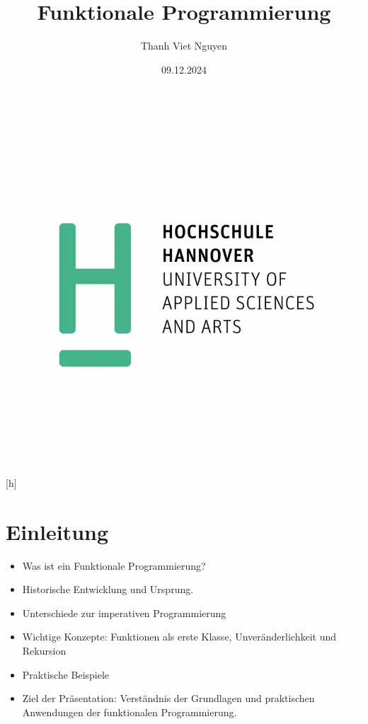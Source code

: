 \documentclass{beamer}
\title{Funktionale Programmierung}
\author{Thanh Viet Nguyen}
\begin{document}
\begin{frame}%
    \maketitle
    \centering
 \includegraphics[scale=0.15]{bilder/hsh-logo.jpg}[h]
   \date{09.12.2024}

\end{frame}

\begin{frame}
	\tableofcontents
\end{frame}


\section{Einleitung}
\begin{frame}
\begin{itemize}
\item Was ist ein Funktionale Programmierung? 	
\item Historische Entwicklung und Ursprung.
\item Unterschiede zur imperativen Programmierung
\item Wichtige Konzepte: Funktionen als erste Klasse, Unveränderlichkeit und Rekursion
\item Praktische Beispiele
\item Ziel der Präsentation: Verständnis der Grundlagen und praktischen Anwendungen der funktionalen Programmierung.

\end{itemize}
\end{frame}
\end{document}
